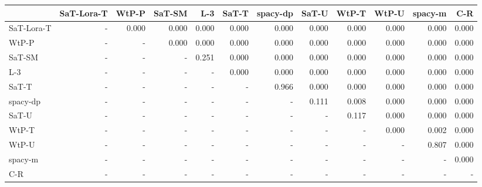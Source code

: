 \begin{tabular}{lrrrrrrrrrrr}
\toprule
 & SaT-Lora-T & WtP-P & SaT-SM & L-3 & SaT-T & spacy-dp & SaT-U & WtP-T & WtP-U & spacy-m & C-R \\
\midrule
SaT-Lora-T & - & 0.000 & 0.000 & 0.000 & 0.000 & 0.000 & 0.000 & 0.000 & 0.000 & 0.000 & 0.000 \\
WtP-P & - & - & 0.000 & 0.000 & 0.000 & 0.000 & 0.000 & 0.000 & 0.000 & 0.000 & 0.000 \\
SaT-SM & - & - & - & 0.251 & 0.000 & 0.000 & 0.000 & 0.000 & 0.000 & 0.000 & 0.000 \\
L-3 & - & - & - & - & 0.000 & 0.000 & 0.000 & 0.000 & 0.000 & 0.000 & 0.000 \\
SaT-T & - & - & - & - & - & 0.966 & 0.000 & 0.000 & 0.000 & 0.000 & 0.000 \\
spacy-dp & - & - & - & - & - & - & 0.111 & 0.008 & 0.000 & 0.000 & 0.000 \\
SaT-U & - & - & - & - & - & - & - & 0.117 & 0.000 & 0.000 & 0.000 \\
WtP-T & - & - & - & - & - & - & - & - & 0.000 & 0.002 & 0.000 \\
WtP-U & - & - & - & - & - & - & - & - & - & 0.807 & 0.000 \\
spacy-m & - & - & - & - & - & - & - & - & - & - & 0.000 \\
C-R & - & - & - & - & - & - & - & - & - & - & - \\
\bottomrule
\end{tabular}

